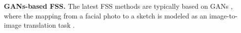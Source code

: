 \documentclass[10pt,twocolumn,letterpaper]{article}
\begin{document}
\textbf{GANs-based FSS.}
\label{ssec:fss}
The latest FSS methods are typically based on GANs \cite{Isola2017Pix2Pix, Gui2020ReviewGAN}, where the mapping from a facial photo to a sketch is modeled as an image-to-image translation task \cite{Isola2017Pix2Pix}.
%
\end{document}
